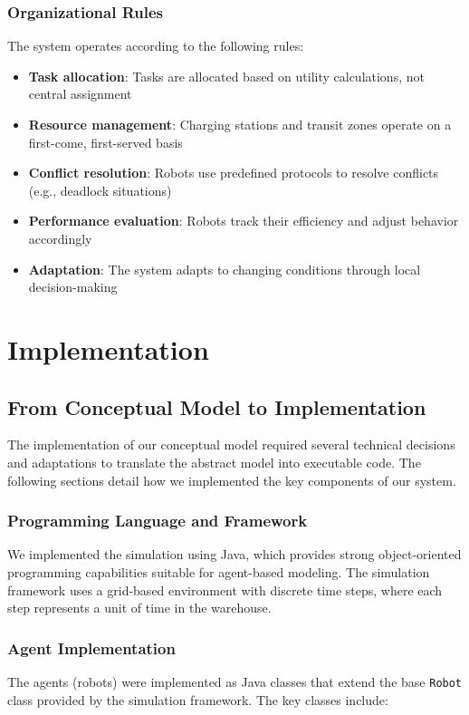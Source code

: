 \documentclass[12pt,a4paper]{article}
\begin{document}
\subsubsection{Organizational Rules}
The system operates according to the following rules:
\begin{itemize}
    \item \textbf{Task allocation}: Tasks are allocated based on utility calculations, not central assignment
    \item \textbf{Resource management}: Charging stations and transit zones operate on a first-come, first-served basis
    \item \textbf{Conflict resolution}: Robots use predefined protocols to resolve conflicts (e.g., deadlock situations)
    \item \textbf{Performance evaluation}: Robots track their efficiency and adjust behavior accordingly
    \item \textbf{Adaptation}: The system adapts to changing conditions through local decision-making
\end{itemize}

\section{Implementation}

\subsection{From Conceptual Model to Implementation}
The implementation of our conceptual model required several technical decisions and adaptations to translate the abstract model into executable code. The following sections detail how we implemented the key components of our system.

\subsubsection{Programming Language and Framework}
We implemented the simulation using Java, which provides strong object-oriented programming capabilities suitable for agent-based modeling. The simulation framework uses a grid-based environment with discrete time steps, where each step represents a unit of time in the warehouse.

\subsubsection{Agent Implementation}
The agents (robots) were implemented as Java classes that extend the base \texttt{Robot} class provided by the simulation framework. The key classes include:
\end{document}

